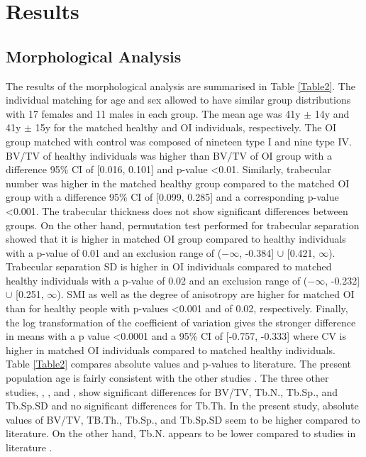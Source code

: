 \documentclass[a4paper,fleqn]{DC_ArtStyle}
\begin{document}
	
	\section{Results}
	\subsection{Morphological Analysis}
	The results of the morphological analysis are summarised in Table \ref{Table2}. The individual matching for age and sex allowed to have similar group distributions with 17 females and 11 males in each group. The mean age was 41y $\pm$ 14y and 41y $\pm$ 15y for the mat\-ched healthy and OI individuals, respectively. The OI group matched with control was composed of nineteen type I and nine type IV. BV/TV of healthy individuals was higher than BV/TV of OI group with a difference 95\% CI of [0.016, 0.101] and p-value <0.01. Similarly, trabecular number was higher in the matched healthy group compared to the matched OI group with a difference 95\% CI of [0.099, 0.285] and a corresponding p-value <0.001. The trabecular thickness does not show significant differences between groups. On the other hand, permutation test performed for trabecular separation showed that it is higher in matched OI group compared to healthy individuals with a p-value of 0.01 and an exclusion range of ($-\infty$, -0.384] $\cup$ [0.421, $\infty$). Trabecular separation SD is higher in OI individuals compared to matched healthy individuals with a p-value of 0.02 and an exclusion range of ($-\infty$, -0.232] $\cup$ [0.251, $\infty$). SMI as well as the degree of anisotropy are higher for matched OI than for healthy people with p-values <0.001 and of 0.02, respectively. Finally, the log transformation of the coefficient of variation gives the stronger difference in means with a p value <0.0001 and a 95\% CI of [-0.757, -0.333] where CV is higher in matched OI individuals compared to matched healthy individuals.\\
	
	Table \ref{Table2} compares absolute values and p-values to literature. The present population age is fairly consistent with the other studies \cite{Folkestad2012,Kocijan2015,Rolvien2018}. The three other studies,  \citeauthor{Folkestad2012}\cite{Folkestad2012}, \citeauthor{Kocijan2015}\cite{Kocijan2015}, and \citeauthor{Rolvien2018}\cite{Rolvien2018}, show significant differences for BV/TV, Tb.N., Tb.Sp., and Tb.Sp.SD and no significant differences for Tb.Th. In the present study, absolute values of BV/TV, TB.Th., Tb.Sp., and Tb.Sp.SD seem to be higher compared to literature. On the other hand, Tb.N. appears to be lower compared to studies in literature \cite{Folkestad2012,Kocijan2015,Rolvien2018}.
	
\end{document}

